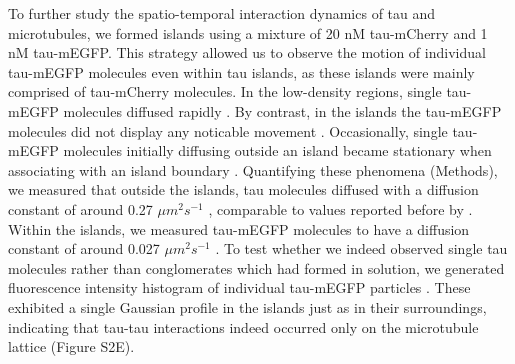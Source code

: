 To further study the spatio-temporal interaction dynamics of tau and microtubules, we formed islands using a mixture of 20 nM tau-mCherry and 1 nM tau-mEGFP. This strategy allowed us to observe the motion of individual tau-mEGFP molecules even within tau islands, as these islands were mainly comprised of tau-mCherry molecules. In the low-density regions, single tau-mEGFP molecules diffused rapidly . By contrast, in the islands the tau-mEGFP molecules did not display any noticable movement . Occasionally, single tau-mEGFP molecules initially diffusing outside an island became stationary when associating with an island boundary . Quantifying these phenomena (Methods), we measured that outside the islands, tau molecules diffused with a diffusion constant of around 0.27 $\mu m^2s^{-1}$ , comparable to values reported before by \cite{Hinrichs2012b}. Within the islands, we measured tau-mEGFP molecules to have a diffusion constant of around 0.027 $\mu m^2s^{-1}$ . To test whether we indeed observed single tau molecules rather than conglomerates which had formed in solution, we generated fluorescence intensity histogram of individual tau-mEGFP particles . These exhibited a single Gaussian profile in the islands just as in their surroundings, indicating that tau-tau interactions indeed occurred only on the microtubule lattice (Figure S2E). \par

